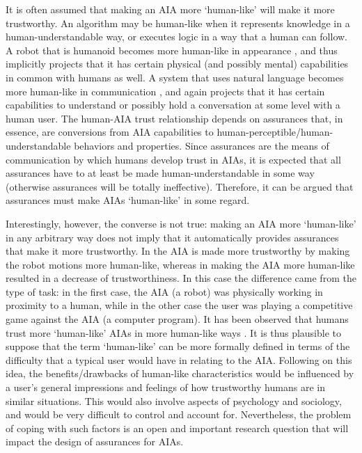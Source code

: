 It is often assumed that making an AIA more `human-like' will make it more trustworthy. 
An algorithm may be human-like when it represents knowledge in a human-understandable way, or executes logic in a way that a human can follow. 
A robot that is humanoid becomes more human-like in appearance \cite{Bainbridge2011-pl}, and thus implicitly projects that it has certain physical (and possibly mental) capabilities in common with humans as well. 
A system that uses natural language becomes more human-like in communication \cite{Lacave2002-cu}, and again projects that it has certain capabilities to understand or possibly hold a conversation at some level with a human user. 
The human-AIA trust relationship depends on assurances that, in essence, are conversions from AIA capabilities to human-perceptible/human-understandable behaviors and properties.  
Since assurances are the means of communication by which humans develop trust in AIAs, it is expected that all assurances have to at least be made human-understandable in some way (otherwise assurances will be totally ineffective). Therefore, it can be argued that assurances must make AIAs `human-like' in some regard.  

Interestingly, however, the converse is not true: making an AIA more `human-like' in any arbitrary way does not imply that it automatically provides assurances that make it more trustworthy. 
In \cite{Dragan2013-wd} the AIA is made more trustworthy by making the robot motions more human-like, whereas in \cite{Wu2016-ei} making the AIA more human-like resulted in a decrease of trustworthiness. In this case the difference came from the type of task: in the first case, the AIA (a robot) was physically working in proximity to a human, while in the other case the user was playing a competitive game against the AIA (a computer program). 
It has been observed that humans trust more `human-like' AIAs in more human-like ways \citet{Tripp2011-rx}. 
It is thus plausible to suppose that the term `human-like' can be more formally defined in terms of the difficulty that a typical user would have in relating to the AIA. 
Following on this idea, the benefits/drawbacks of human-like characteristics would be influenced by a user's general impressions and feelings of how trustworthy humans are in similar situations. 
This would also involve aspects of psychology and sociology, and would be very difficult to control and account for. 
Nevertheless, the problem of coping with such factors is an open and important research question that will impact the design of assurances for AIAs. 

